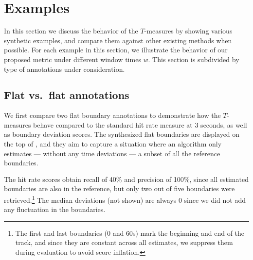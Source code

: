 \documentclass{article}
\begin{document}
\section{Examples}\label{sec:examples}

In this section we discuss the behavior of the $T$-measures by showing various synthetic examples, and compare them against other existing methods when possible.
For each example in this section, we illustrate the behavior of our proposed metric under different window times $w$.
This section is subdivided by type of annotations under consideration.

\subsection{Flat vs.\ flat annotations}

We first compare two flat boundary annotations to demonstrate how the $T$-measures behave compared to the standard hit rate measure at 3 seconds, as well as boundary deviation scores.
The synthesized flat boundaries are displayed on the top of , and they aim to capture a situation where an algorithm only estimates --- without any time deviations --- a subset of all the reference boundaries.

The hit rate scores obtain recall of 40\% and precision of 100\%, since all estimated boundaries are also in the reference, but only two out of five boundaries were retrieved.\footnote{The first and last boundaries ($0$ and $60$s) mark the beginning and end of the track, and since they 
are constant across all estimates, we suppress them during evaluation to avoid score inflation.}
The median deviations (not shown) are always 0 since we did not add any fluctuation in
the boundaries.
\end{document}
